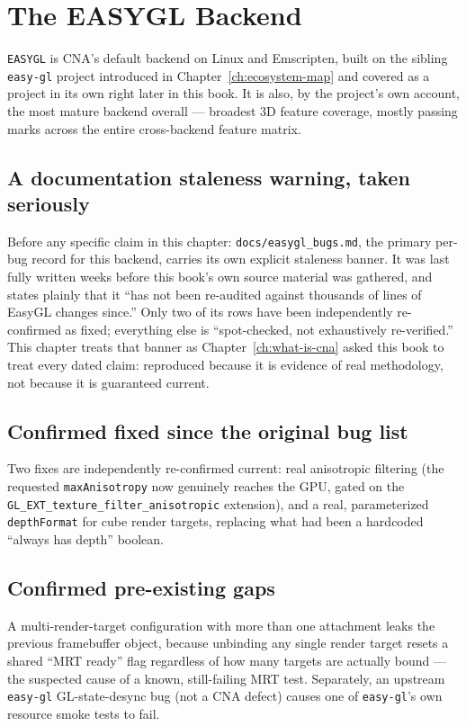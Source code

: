 \chapter{The EASYGL Backend}
\label{ch:easygl-backend}

\texttt{EASYGL} is CNA's default backend on Linux and Emscripten, built on the sibling
\texttt{easy-gl} project introduced in Chapter~\ref{ch:ecosystem-map} and covered as a
project in its own right later in this book. It is also, by the project's own account, the most
mature backend overall --- broadest 3D feature coverage, mostly passing marks across the
entire cross-backend feature matrix.

\section{A documentation staleness warning, taken seriously}

Before any specific claim in this chapter: \texttt{docs/easygl\_bugs.md}, the primary
per-bug record for this backend, carries its own explicit staleness banner. It was last
fully written weeks before this book's own source material was gathered, and states plainly
that it ``has not been re-audited against thousands of lines of EasyGL changes since.'' Only
two of its rows have been independently re-confirmed as fixed; everything else is
``spot-checked, not exhaustively re-verified.'' This chapter treats that banner as
Chapter~\ref{ch:what-is-cna} asked this book to treat every dated claim: reproduced because
it is evidence of real methodology, not because it is guaranteed current.

\section{Confirmed fixed since the original bug list}

Two fixes are independently re-confirmed current: real anisotropic filtering (the requested
\texttt{maxAnisotropy} now genuinely reaches the GPU, gated on the
\texttt{GL\_EXT\_texture\_filter\_anisotropic} extension), and a real, parameterized
\texttt{depthFormat} for cube render targets, replacing what had been a hardcoded
``always has depth'' boolean.

\section{Confirmed pre-existing gaps}

A multi-render-target configuration with more than one attachment leaks the previous
framebuffer object, because unbinding any single render target resets a shared ``MRT ready''
flag regardless of how many targets are actually bound --- the suspected cause of a known,
still-failing MRT test. Separately, an upstream \texttt{easy-gl} GL-state-desync bug (not a
CNA defect) causes one of \texttt{easy-gl}'s own resource smoke tests to fail.

